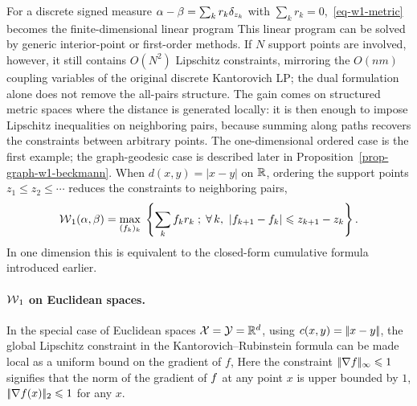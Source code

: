 For a discrete signed measure $\alpha-\beta=\sum_k r_k\delta_{z_k}$ with $\sum_k r_k=0$,~\eqref{eq-w1-metric} becomes the finite-dimensional linear program
This linear program can be solved by generic interior-point or first-order methods. If $N$ support points are involved, however, it still contains $O(N^2)$ Lipschitz constraints, mirroring the $O(nm)$ coupling variables of the original discrete Kantorovich LP; the dual formulation alone does not remove the all-pairs structure. The gain comes on structured metric spaces where the distance is generated locally: it is then enough to impose Lipschitz inequalities on neighboring pairs, because summing along paths recovers the constraints between arbitrary points. The one-dimensional ordered case is the first example; the graph-geodesic case is described later in Proposition~\ref{prop-graph-w1-beckmann}.
When $d(x,y)=|x-y|$ on $\mathbb{R}$, ordering the support points $z_1\leq z_2\leq\cdots$ reduces the constraints to neighboring pairs,
\[
	\operatorname{\mathcal{W}}_1(\alpha,\beta)
	=
	\underset{(f_k)_k}{\max}\;
	\left\{ \sum_k f_k r_k \;;\; \forall \, k,\ |f_{k+1}-f_k|\leqslant z_{k+1}-z_k \right\}.
\]
In one dimension this is equivalent to the closed-form cumulative formula introduced earlier.

\paragraph{$\operatorname{\mathcal{W}}_1$ on Euclidean spaces.}

In the special case of Euclidean spaces $\mathcal{X}=\mathcal{Y}=\mathbb{R}^d$, using $c(x,y) = |\!| x-y |\!|$, the global Lipschitz constraint in the Kantorovich--Rubinstein formula can be made local as a uniform bound on the gradient of $f$,
Here the constraint $|\!| \nabla f |\!|_\infty \leqslant 1$ signifies that the norm of the gradient of $f$ at any point $x$ is upper bounded by $1$, $|\!| \nabla f(x) |\!|_2 \leqslant 1$ for any $x$.

